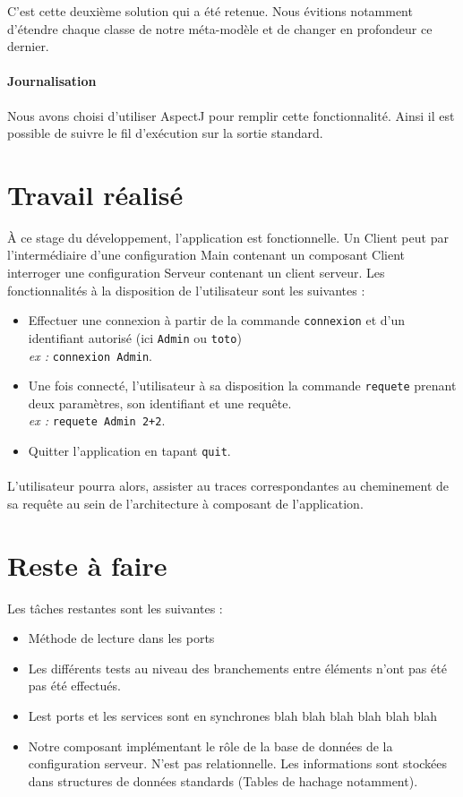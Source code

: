 \documentclass[11pt]{article}
\begin{document}
C'est cette deuxième solution qui a été retenue. Nous évitions notamment d'étendre chaque classe de notre méta-modèle et de changer en profondeur ce dernier.

\paragraph{Journalisation}
Nous avons choisi d'utiliser AspectJ pour remplir cette fonctionnalité.  Ainsi il est possible de suivre le fil d'exécution sur la sortie standard.

\section{Travail réalisé}
À ce stage du développement, l'application est fonctionnelle. Un Client peut par l'intermédiaire d'une configuration \og Main \fg{} contenant un composant Client interroger une configuration Serveur contenant un client serveur. Les fonctionnalités à la disposition de l'utilisateur sont les suivantes :
\begin{itemize}
\item
  Effectuer une connexion à partir de la commande \verb+connexion+ et d'un identifiant autorisé (ici \verb+Admin+ ou \verb+toto+)\hfill \\
  \emph{ex :} \verb-connexion Admin-.
\item
  Une fois connecté, l'utilisateur à sa disposition la commande \verb+requete+ prenant deux paramètres, son identifiant et une requête.  \hfill \\ 
  \emph{ex : }\verb-requete Admin 2+2-.
\item
  Quitter l'application en tapant \verb+quit+.
\end{itemize}
\paragraph{}

L'utilisateur pourra alors, assister au traces correspondantes au cheminement de sa requête au sein de l'architecture à composant de l'application.


\section{Reste à faire}
Les tâches restantes sont les suivantes : 

\begin{itemize}
\item
  Méthode de lecture dans les ports
\item
  Les différents tests au niveau des branchements entre éléments n'ont pas été pas été effectués.   

\item
  Lest ports et les services sont en synchrones blah blah blah  blah blah blah 
\item
  Notre composant implémentant le rôle de la base de données de la configuration serveur. N'est pas relationnelle. Les informations sont stockées dans structures de données standards (Tables de hachage notamment).
  
  
\end{itemize}
\end{document}
